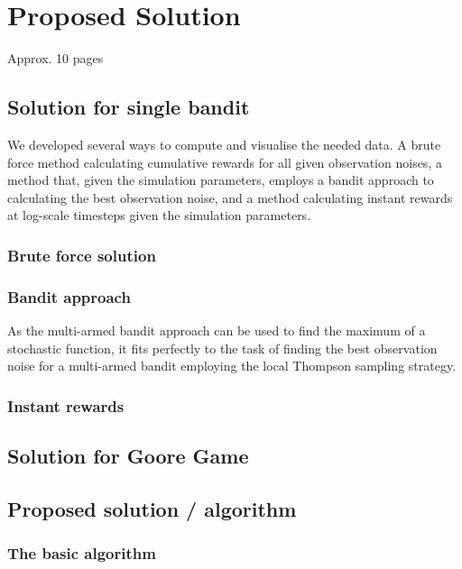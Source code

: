 \chapter{Proposed Solution}
\label{ch:solution}
Approx. 10 pages

\section{Solution for single bandit}

We developed several ways to compute and visualise the needed data. A brute
force method calculating cumulative rewards for all given observation noises, a
method that, given the simulation parameters, employs a bandit approach to
calculating the best observation noise, and a method calculating instant
rewards at log-scale timesteps given the simulation parameters.

\subsection{Brute force solution}

\subsection{Bandit approach}

As the multi-armed bandit approach can be used to find the maximum of a
stochastic function, it fits perfectly to the task of finding the best
observation noise for a multi-armed bandit employing the local Thompson
sampling strategy.

\subsection{Instant rewards}


\section{Solution for Goore Game}




\section{Proposed solution / algorithm}

\subsection{The basic algorithm}

